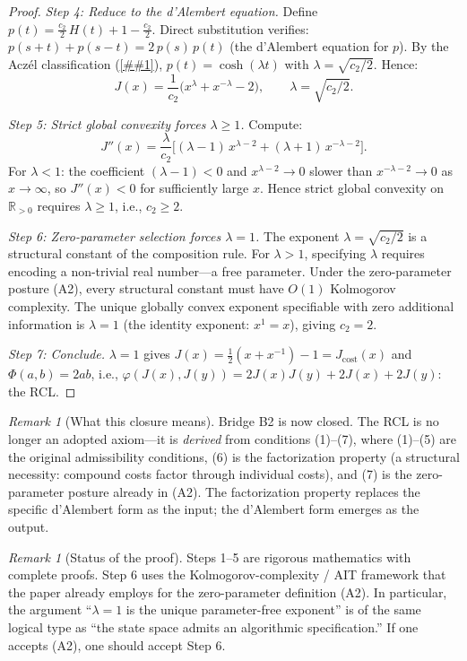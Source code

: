 \documentclass[11pt]{article}
\providecommand{\cref}[1]{\ref{##1}}%
\newcommand{\Rp}{\mathbb{R}_{>0}}
\newcommand{\Jcost}{J_{\mathrm{cost}}}
\theoremstyle{definition}
\theoremstyle{remark}
\newtheorem{remark}[theorem]{Remark}
\begin{document}
\begin{proof}
\medskip
\noindent\emph{Step 4: Reduce to the d'Alembert equation.}
Define $p(t) = \tfrac{c_2}{2}\, H(t) + 1 - \tfrac{c_2}{2}$.
Direct substitution verifies:
$p(s + t) + p(s - t) = 2\, p(s)\, p(t)$
(the d'Alembert equation for $p$).
By the Acz\'el classification (\cref{thm:aczel}),
$p(t) = \cosh(\lambda t)$ with $\lambda = \sqrt{c_2/2}$.
Hence:
\[
J(x) = \frac{1}{c_2}\bigl(x^{\lambda} + x^{-\lambda} - 2\bigr),
\qquad \lambda = \sqrt{c_2/2}.
\]

\medskip
\noindent\emph{Step 5: Strict global convexity forces $\lambda \geq 1$.}
Compute:
\[
J''(x) = \frac{\lambda}{c_2}
  \bigl[(\lambda - 1)\, x^{\lambda - 2}
  + (\lambda + 1)\, x^{-\lambda - 2}\bigr].
\]
For $\lambda < 1$: the coefficient $(\lambda - 1) < 0$ and
$x^{\lambda - 2} \to 0$ slower than $x^{-\lambda - 2} \to 0$ as
$x \to \infty$, so $J''(x) < 0$ for sufficiently large $x$.
Hence strict global convexity on $\Rp$ requires $\lambda \geq 1$,
i.e., $c_2 \geq 2$.

\medskip
\noindent\emph{Step 6: Zero-parameter selection forces $\lambda = 1$.}
The exponent $\lambda = \sqrt{c_2/2}$ is a structural constant
of the composition rule.
For $\lambda > 1$, specifying $\lambda$ requires encoding a
non-trivial real number---a free parameter.
Under the zero-parameter posture (A2), every structural constant
must have $O(1)$ Kolmogorov complexity.
The unique globally convex exponent specifiable with zero
additional information is $\lambda = 1$ (the identity exponent:
$x^1 = x$), giving $c_2 = 2$.

\medskip
\noindent\emph{Step 7: Conclude.}
$\lambda = 1$ gives $J(x) = \frac{1}{2}(x + x^{-1}) - 1 = \Jcost(x)$
and $\Phi(a, b) = 2ab$, i.e.,
$\varphi(J(x), J(y)) = 2J(x)J(y) + 2J(x) + 2J(y)$: the RCL.
\end{proof}

\begin{remark}[What this closure means]
Bridge B2 is now closed.
The RCL is no longer an adopted axiom---it is \emph{derived}
from conditions (1)--(7), where (1)--(5) are the original
admissibility conditions, (6) is the factorization property
(a structural necessity: compound costs factor through individual
costs), and (7) is the zero-parameter posture already in (A2).
The factorization property replaces the specific d'Alembert form
as the input; the d'Alembert form emerges as the output.
\end{remark}

\begin{remark}[Status of the proof]
Steps 1--5 are rigorous mathematics with complete proofs.
Step 6 uses the Kolmogorov-complexity / AIT framework that
the paper already employs for the zero-parameter definition
(A2).
In particular, the argument ``$\lambda = 1$ is the unique
parameter-free exponent'' is of the same logical type as
``the state space admits an algorithmic specification.''
If one accepts (A2), one should accept Step 6.
\end{remark}
\end{document}

